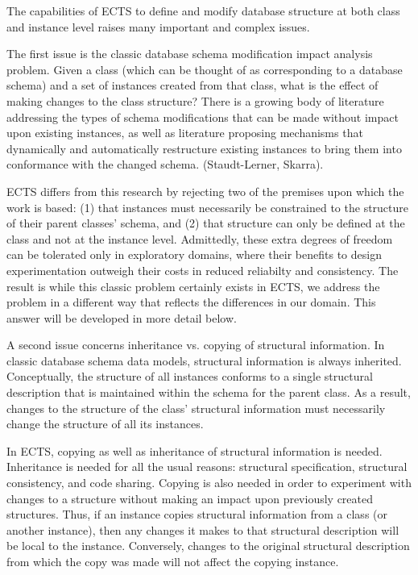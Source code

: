 The capabilities of ECTS to define and modify database structure
at both class and instance level raises many important and complex issues.

The first issue is the classic database schema modification impact analysis
problem.  Given a class (which can be thought of as corresponding to a database
schema) and a set of instances created from that class, what is the effect of 
making changes to the class structure?   There is a growing body of literature 
addressing the types of schema modifications that can be made without impact 
upon existing instances, as well as literature proposing mechanisms that 
dynamically and automatically restructure existing instances to bring them into
conformance with the changed schema. (Staudt-Lerner, Skarra).   

ECTS differs from this research by rejecting two of the premises upon which the
work is based: (1) that instances must necessarily be constrained to the 
structure of their parent classes' schema, and (2) that structure can only be 
defined at the class and not at the instance level.   Admittedly, these extra 
degrees of freedom can be tolerated only in exploratory domains, where their 
benefits to design experimentation outweigh their costs in reduced reliabilty 
and consistency.   The result is while this classic problem certainly exists in
ECTS, we address the problem in a different way that reflects the differences in
our domain.  This answer will be developed in more detail below.

A second issue concerns inheritance vs. copying of structural information.  In 
classic database schema data models, structural information is always inherited.
Conceptually, the structure of all instances conforms to a single structural 
description that is maintained within the schema for the parent class.  As a 
result, changes to the structure of the class' structural information must 
necessarily change the structure of all its instances. 

In ECTS, copying as well as inheritance of structural information is
needed.  Inheritance is needed for all the usual reasons: structural
specification, structural consistency, and code sharing. Copying is
also needed in order to experiment with changes to a structure without
making an impact upon previously created structures. Thus, if an
instance copies structural information from a class (or another
instance), then any changes it makes to that structural description
will be local to the instance.  Conversely, changes to the original
structural description from which the copy was made will not affect
the copying instance.

